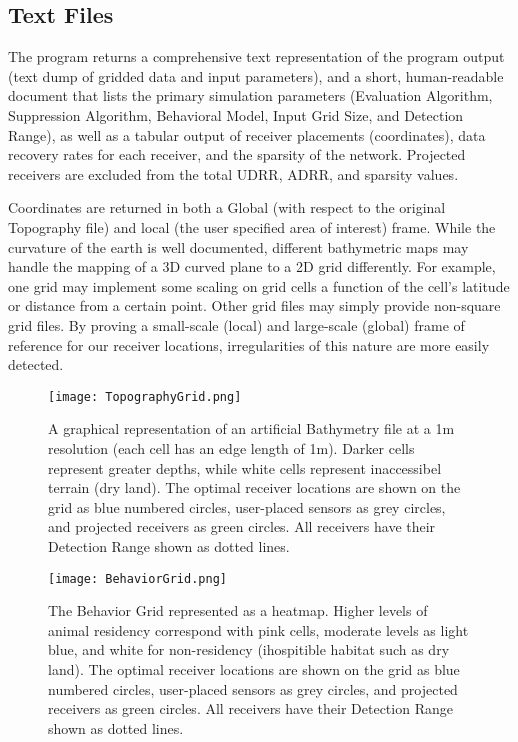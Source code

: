 \subsection{Text Files}
The program returns a comprehensive text representation of the program output (text dump of gridded data and input parameters), and a short, human-readable document that lists the primary simulation parameters (Evaluation Algorithm, Suppression Algorithm, Behavioral Model, Input Grid Size, and Detection Range), as well as a tabular output of receiver placements (coordinates), data recovery rates for each receiver, and the sparsity of the network.  Projected receivers are excluded from the total UDRR, ADRR, and sparsity values.

Coordinates are returned in both a Global (with respect to the original Topography file) and local (the user specified area of interest) frame.  While the curvature of the earth is well documented, different bathymetric maps may handle the mapping of a 3D curved plane to a 2D grid differently.  For example, one grid may implement some scaling on grid cells a function of the cell's latitude or distance from a certain point.  Other grid files may simply provide non-square grid files.  By proving a small-scale (local) and large-scale (global) frame of reference for our receiver locations, irregularities of this nature are more easily detected.

\begin{figure}[h!]
	\label{outputGraphs}
	\texttt{[image: TopographyGrid.png]}
	\caption{A graphical representation of an artificial Bathymetry file at a 1m resolution (each cell has an edge length of 1m).  Darker cells represent greater depths, while white cells represent inaccessibel terrain (dry land).  The optimal receiver locations are shown on the grid as blue numbered circles, user-placed sensors as grey circles, and projected receivers as green circles.  All receivers have their Detection Range shown as dotted lines.}\label{bathyGraph}
\end{figure}

\begin{figure}[h]
	\texttt{[image: BehaviorGrid.png]}
	\caption{The Behavior Grid represented as a heatmap.  Higher levels of animal residency correspond with pink cells, moderate levels as light blue, and white for non-residency (ihospitible habitat such as  dry land).  The optimal receiver locations are shown on the grid as blue numbered circles, user-placed sensors as grey circles, and projected receivers as green circles.  All receivers have their Detection Range shown as dotted lines.}\label{animalGraph}
\end{figure}

